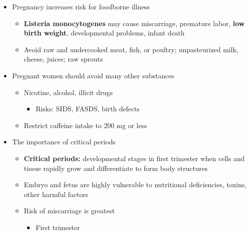 \documentclass[12pt]{article}
\begin{document}
\begin{itemize}
                \item Pregnancy increases risk for foodborne illness
                    \begin{itemize}
                        \item \textbf{Listeria monocytogenes} may cause miscarriage, premature labor, \textbf{low birth weight}, developmental problems, infant death
                        \item Avoid raw and undercooked meat, fish, or poultry; unpasteurized milk, cheese, juices; raw sprouts
                    \end{itemize}
                \item Pregnant women should avoid many other substances
                    \begin{itemize}
                        \item Nicotine, alcohol, illicit drugs
                            \begin{itemize}
                                \item Risks: SIDS, FASDS, birth defects
                            \end{itemize}
                        \item Restrict caffeine intake to 200 mg or less
                    \end{itemize}
                \item The importance of critical periods
                    \begin{itemize}
                        \item \textbf{Critical periods:} developmental stages in first trimester when cells and tissue rapidly grow and differentiate to form body structures
                        \item Embryo and fetus are highly vulnerable to nutritional deficiencies, toxins, other harmful factors
                        \item Risk of miscarriage is greatest
                            \begin{itemize}
                                \item First trimester
                            \end{itemize}
                    \end{itemize}
            \end{itemize}
        
\end{document}
